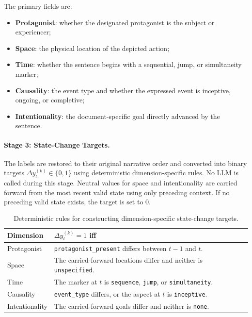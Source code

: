 \documentclass[11pt]{article}
\begin{document}
The primary fields are:
\begin{itemize}
\item \textbf{Protagonist}: whether the designated protagonist is the subject or experiencer;
\item \textbf{Space}: the physical location of the depicted action;
\item \textbf{Time}: whether the sentence begins with a sequential, jump, or simultaneity marker;
\item \textbf{Causality}: the event type and whether the expressed event is inceptive, ongoing, or completive;
\item \textbf{Intentionality}: the document-specific goal directly advanced by the sentence.
\end{itemize}

\paragraph{Stage 3: State-Change Targets.}
The labels are restored to their original narrative order and converted into binary targets $\Delta y_t^{(k)}\in \{0,1\}$ using deterministic dimension-specific rules. No LLM is called during this stage. Neutral values for space and intentionality are carried forward from the most recent valid state using only preceding context. If no preceding valid state exists, the target is set to $0$.

\begin{table}[h]
\centering
\scriptsize
\begin{tabular}{@{}lp{4.8cm}@{}}
\toprule
\textbf{Dimension} & \textbf{$\Delta y_t^{(k)}=1$ iff} \\
\midrule
Protagonist &
\texttt{protagonist\_present} differs between $t-1$ and $t$. \\
Space &
The carried-forward locations differ and neither is \texttt{unspecified}. \\
Time &
The marker at $t$ is \texttt{sequence}, \texttt{jump}, or \texttt{simultaneity}. \\
Causality &
\texttt{event\_type} differs, or the aspect at $t$ is \texttt{inceptive}. \\
Intentionality &
The carried-forward goals differ and neither is \texttt{none}. \\
\bottomrule
\end{tabular}
\caption{Deterministic rules for constructing dimension-specific state-change targets.}
\label{tab:annotation-rules}
\end{table}
\end{document}
